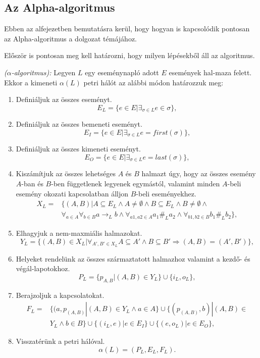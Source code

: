 \subsection{Az Alpha-algoritmus}

Ebben az alfejezetben bemutatásra kerül, hogy hogyan is kapcsolódik pontosan az Alpha-algoritmus a dolgozat témájához.

Először is pontosan meg kell határozni, hogy milyen lépésekből áll az algoritmus.

\begin{definition}{\textit{($\alpha$-algoritmus):}} Legyen $L$ egy eseménynapló adott $E$ események hal\hyp{}maza felett. Ekkor a kimeneti $\alpha (L)$ petri hálót az alábbi módon határozzuk meg:
\begin{enumerate}
	\item Definiáljuk az összes eseményt.\\
	\[
		E_L = \{ e \in E | \exists_{\sigma \in L} e \in \sigma \},
	\]
	\item Definiáljuk az összes bemeneti eseményt.
	\[
		E_I = \{ e \in E | \exists_{\sigma \in L} e = first(\sigma) \},
	\]
	\item Definiáljuk az összes kimeneti eseményt.
	\[
		E_O = \{ e \in E | \exists_{\sigma \in L} e = last(\sigma) \},	
	\]
	\item Kiszámítjuk az összes lehetséges $A$ és $B$ halmazt úgy, hogy az összes esemény $A$-ban és $B$-ben függetlenek legyenek egymástól, valamint minden $A$-beli esemény okozati kapcsolatban álljon $B$-beli eseményekhez.
	\begin{equation*}
	\begin{aligned}
		X_L=
		&\{ (A,B) | A \subseteq E_L \land A \neq \emptyset \land B \subseteq E_L \land B \neq \emptyset \land \\
		&\forall_{a \in A} \forall_{b \in B} a \rightarrow_L b \land \forall_{a1,a2 \in A} a_1\#_L a_2  \land \forall_{b1,b2 \in B} b_1\#_Lb_2\},
	\end{aligned}
	\end{equation*}
	\item Elhagyjuk a nem-maxmiális halmazokat.
	\[
		Y_L = \{ (A,B) \in X_L | \forall_{A',B' \in X_L} A \subseteq A' \land B \subseteq B' \Rightarrow (A,B) = (A',B') \},
	\]
	\item Helyeket rendelünk az összes származtatott halmazhoz valamint a kezdő- és végál\hyp{}lapotokhoz.
	\[
		P_L = \{ p_{A,B} | (A,B) \in Y_L\} \cup \{i_L,o_L\},		
	\]
	\item Berajzoljuk a kapcsolatokat.
	\begin{equation*}
	\begin{aligned}
		F_L=
		&\{(a,p_{(A,B)} | (A,B) \in Y_L \land a \in A \} \cup \{ (p_{(A,B)}, b) | (A,B) \in \\
		&Y_L \land b \in B \} \cup \{ (i_L,e) | e \in E_I \} \cup \{ (e,o_L) | e \in E_O\},
	\end{aligned}
	\end{equation*}
	\item Visszatérünk a petri hálóval.
	\[
		\alpha(L) = (P_L, E_L, F_L).
	\]


\end{enumerate}
\end{definition}
